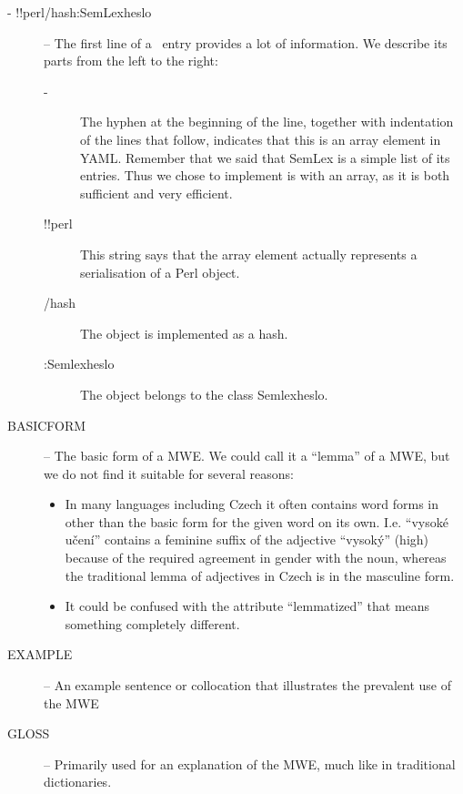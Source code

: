 \begin{description} %
\item [- !!perl/hash:SemLex\textunderscore{}heslo] -- The first line of a \semlex\ entry provides a lot of information. We describe its parts from the left to the right:
    \begin{description}
    \item [- ]The hyphen at the beginning of the line, together with indentation of the lines that follow, indicates that this is an array element in YAML. Remember that we said that SemLex is a simple list of its entries. Thus we chose to implement is with an array, as it is both sufficient and very efficient.
    \item [!!perl] This string says that the array element actually represents a serialisation of a Perl object.
    \item [/hash] The object is implemented as a hash.
    \item [:Semlex\textunderscore{}heslo] The object belongs to the class Semlex\textunderscore{}heslo.
  \end{description}
\item [BASIC\textunderscore{}FORM] -- The basic form of a MWE. We could call it a ``lemma'' of a MWE, but we do not find it suitable for several reasons: 
  \begin{itemize}
    \item In many languages including Czech it often contains word forms in other than the basic form for the given word on its own. I.e. ``vysoké učení'' contains a feminine suffix of the adjective ``vysoký'' (high) because of the required agreement in gender with the noun, whereas the traditional lemma of adjectives in Czech is in the masculine form.
    \item  It could be confused with the attribute ``lemmatized'' that means something completely different.
  \end{itemize}

\item [EXAMPLE] -- An example sentence or collocation that illustrates the prevalent use of the MWE

\item [GLOSS] -- Primarily used for an explanation of the MWE, much like in traditional dictionaries.


\end{description}
